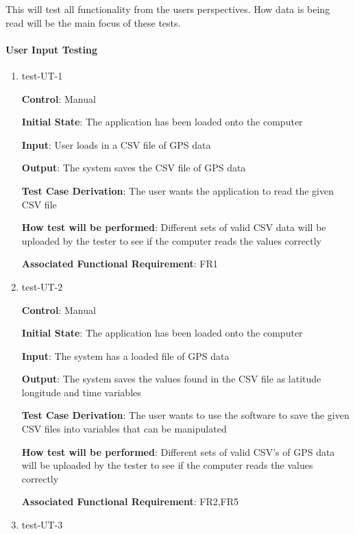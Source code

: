 \documentclass[12pt, titlepage]{article}
\begin{document}
This will test all functionality from the users perspectives. How data is being read will be the main focus of these tests. 
		
\paragraph{User Input Testing}

\begin{enumerate}

\item{test-UT-1\\}

\textbf{Control}: Manual 
					
\textbf{Initial State}: The application has been loaded onto the computer
					
\textbf{Input}: User loads in a CSV file of GPS data
				
\textbf{Output}: The system saves the CSV file of GPS data

\textbf{Test Case Derivation}: The user wants the application to read the given CSV file 
					
\textbf{How test will be performed}: Different sets of valid CSV data will be uploaded by the tester to see if the computer reads the values correctly

\textbf{Associated Functional Requirement}: FR1 

\item{test-UT-2\\}

\textbf{Control}: Manual 
					
\textbf{Initial State}: The application has been loaded onto the computer
					
\textbf{Input}: The system has a loaded file of GPS data 
					
\textbf{Output}: The system saves the values found in the CSV file as latitude longitude and time variables

\textbf{Test Case Derivation}: The user wants to use the software to save the given CSV files into variables that can be manipulated
					
\textbf{How test will be performed}: Different sets of valid CSV's of GPS data will be uploaded by the tester to see if the computer reads the values correctly

\textbf{Associated Functional Requirement}: FR2,FR5

\item{test-UT-3\\}


\end{enumerate}
\end{document}
